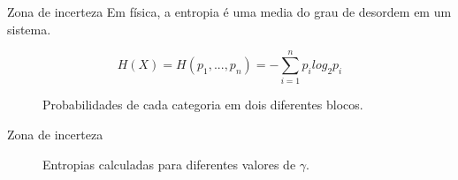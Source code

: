 \documentclass[aspectratio=169]{beamer}
\begin{document}
\begin{frame}{Zona de incerteza}
	Em física, a entropia é uma media do grau de desordem em um sistema.
	
	\begin{equation}
	H(X)=H(p_1, ..., p_n)=-\sum^n_{i=1}p_ilog_{2}p_i
	\end{equation}
	
	\begin{figure}[H] 
		\caption{Probabilidades de cada categoria em dois diferentes blocos.} \label{entro_block}
		\centering
	\end{figure}
\end{frame}

\begin{frame}{Zona de incerteza}
\begin{figure}[H]
	\caption{Entropias calculadas para diferentes valores de $\gamma$.} 
	\label{entro_gamma}
\end{figure}
\end{frame}
\end{document}
